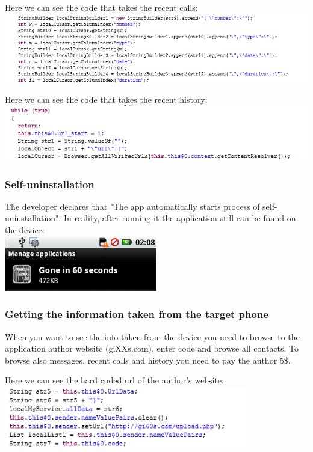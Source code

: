 \parbox{\textwidth}{
Here we can see the code that takes the recent calls: \\
\includegraphics[width=\textwidth]{figs/gone60_9.png}
}

\parbox{\textwidth}{
Here we can see the code that takes the recent history: \\
\includegraphics[width=\textwidth]{figs/gone60_10.png}
}

\subsubsection{Self-uninstallation}
\parbox{\textwidth}{
The developer declares that "The app automatically starts process of self-uninstallation". In reality, after running it the application still can be found on the device: \\
\includegraphics[width=0.5\textwidth]{figs/gone60_11.png}
}

\subsubsection{Getting the information taken from the target phone}
When you want to see the info taken from the device you need to browse to the application author website (giXXs.com), enter code and browse all contacts. To browse also messages, recent calls and history you need to pay the author 5\$.

\parbox{\textwidth}{
Here we can see the hard coded url of the author's website: \\
\includegraphics[width=0.8\textwidth]{figs/gone60_12.png}
}

